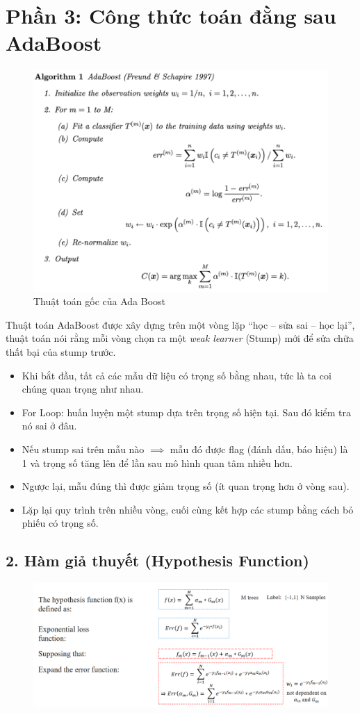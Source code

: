 \documentclass[11pt]{article}
\begin{document}
\section{Phần 3: Công thức toán đằng sau AdaBoost}
    \begin{figure}[H]
    \centering
    \includegraphics[width=0.7\linewidth]{images/math_ada_1.png}
    \caption{Thuật toán gốc của Ada Boost}
    \end{figure}
Thuật toán AdaBoost được xây dựng trên một vòng lặp “học – sửa sai – học lại”, thuật toán nói rằng mỗi vòng chọn ra một \textit{weak learner} (Stump) mới để sửa chữa thất bại của stump trước.  
\begin{itemize}
    \item Khi bắt đầu, tất cả các mẫu dữ liệu có trọng số bằng nhau, tức là ta coi chúng quan trọng như nhau.
    \item For Loop: huấn luyện một stump dựa trên trọng số hiện tại. Sau đó kiểm tra nó sai ở đâu.
    \item Nếu stump sai trên mẫu nào \(\implies\) mẫu đó được flag (đánh dấu, báo hiệu) là 1 và trọng số tăng lên để lần sau mô hình quan tâm nhiều hơn.
    \item Ngược lại, mẫu đúng thì được giảm trọng số (ít quan trọng hơn ở vòng sau).
    \item Lặp lại quy trình trên nhiều vòng, cuối cùng kết hợp các stump bằng cách bỏ phiếu có trọng số.
\end{itemize}


\subsection*{2. Hàm giả thuyết (Hypothesis Function)}

    \begin{figure}[H]
    \centering
    \includegraphics[width=0.7\linewidth]{images/math3.png}
    \end{figure}
\end{document}
